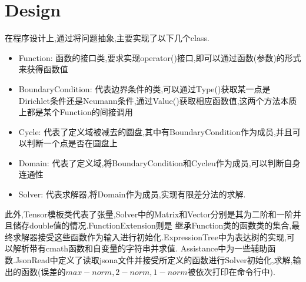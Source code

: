 \chapter{Design}
\label{ch:design}


在程序设计上,通过将问题抽象,主要实现了以下几个class.

\begin{itemize}
  \item Function: 函数的接口类,要求实现operator()接口,即可以通过函数(参数)的形式来获得函数值
  \item BoundaryCondition: 代表边界条件的类,可以通过Type()获取某一点是Dirichlet条件还是Neumann条件,通过Value()获取相应函数值,这两个方法本质上都是某个Function的间接调用
  \item Cycle: 代表了定义域被减去的圆盘,其中有BoundaryCondition作为成员,并且可以判断一个点是否在圆盘上
  \item Domain: 代表了定义域,将BoundaryCondition和Cycleu作为成员,可以判断自身连通性
  \item Solver: 代表求解器,将Domain作为成员,实现有限差分法的求解.
\end{itemize}

此外,Tensor模板类代表了张量,Solver中的Matrix和Vector分别是其为二阶和一阶并且储存double值的情况.FunctionExtension则是
继承Function类的函数类的集合,最终求解器接受这些函数作为输入进行初始化.ExpressionTree中为表达树的实现,可以解析带有cmath函数和自变量的字符串并求值.
Assistance中为一些辅助函数.JsonRead中定义了读取jsona文件并接受所定义的函数进行Solver初始化,求解,输出的函数(误差的$max-norm,2-norm,1-norm$被依次打印在命令行中).